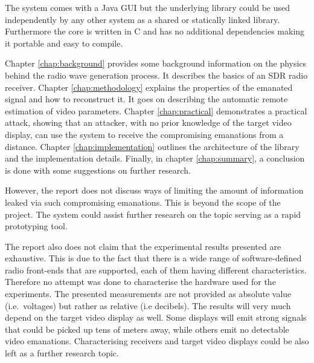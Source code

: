 \documentclass[a4paper,12pt,twoside,openright]{report}
\begin{document}
The system comes with a Java GUI but the underlying library could be used independently by any other system as a shared or statically linked library. Furthermore the core is written in C and has no additional dependencies making it portable and easy to compile.

Chapter \ref{chap:background} provides some background information on the physics behind the radio wave generation process. It describes the basics of an SDR radio receiver. Chapter \ref{chap:methodology} explains the properties of the emanated signal and how to reconstruct it. It goes on describing the automatic remote estimation of video parameters. Chapter \ref{chap:practical} demonstrates a practical attack, showing that an attacker, with no prior knowledge of the target video display, can use the system to receive the compromising emanations from a distance. Chapter \ref{chap:implementation} outlines the architecture of the library and the implementation details. Finally, in chapter \ref{chap:summary}, a conclusion is done with some suggestions on further research.

However, the report does not discuss ways of limiting the amount of information leaked via such compromising emanations. This is beyond the scope of the project. The system could assist further research on the topic serving as a rapid prototyping tool.

The report also does not claim that the experimental results presented are exhaustive. This is due to the fact that there is a wide range of software-defined radio front-ends that are supported, each of them having different characteristics. Therefore no attempt was done to characterise the hardware used for the experiments. The presented measurements are not provided as absolute value (i.e.\  voltages) but rather as relative (i.e decibels). The results will very much depend on the target video display as well. Some displays will emit strong signals that could be picked up tens of meters away, while others emit no detectable video emanations. Characterising receivers and target video displays could be also left as a further research topic.
\end{document}
